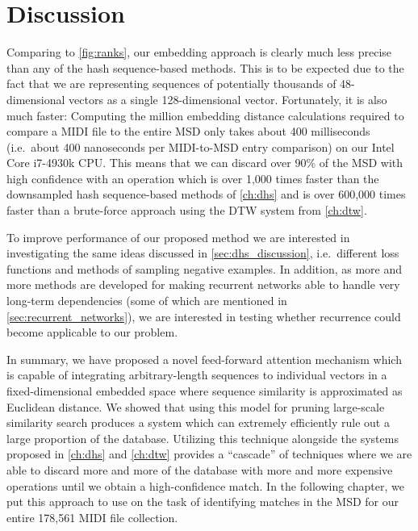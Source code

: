\section{Discussion}
\label{sec:pse_discussion}

Comparing to \cref{fig:ranks}, our embedding approach is clearly much less precise than any of the hash sequence-based methods.
This is to be expected due to the fact that we are representing sequences of potentially thousands of 48-dimensional vectors as a single 128-dimensional vector.
Fortunately, it is also much faster: Computing the million embedding distance calculations required to compare a MIDI file to the entire MSD only takes about 400 milliseconds (i.e.\ about 400 nanoseconds per MIDI-to-MSD entry comparison) on our Intel Core i7-4930k CPU.
This means that we can discard over 90\% of the MSD with high confidence with an operation which is over 1,000 times faster than the downsampled hash sequence-based methods of \cref{ch:dhs} and is over 600,000 times faster than a brute-force approach using the DTW system from \cref{ch:dtw}.

To improve performance of our proposed method we are interested in investigating the same ideas discussed in \cref{sec:dhs_discussion}, i.e.\ different loss functions and methods of sampling negative examples.
In addition, as more and more methods are developed for making recurrent networks able to handle very long-term dependencies (some of which are mentioned in \cref{sec:recurrent_networks}), we are interested in testing whether recurrence could become applicable to our problem.

In summary, we have proposed a novel feed-forward attention mechanism which is capable of integrating arbitrary-length sequences to individual vectors in a fixed-dimensional embedded space where sequence similarity is approximated as Euclidean distance.
We showed that using this model for pruning large-scale similarity search produces a system which can extremely efficiently rule out a large proportion of the database.
Utilizing this technique alongside the systems proposed in \cref{ch:dhs} and \cref{ch:dtw} provides a ``cascade'' of techniques where we are able to discard more and more of the database with more and more expensive operations until we obtain a high-confidence match.
In the following chapter, we put this approach to use on the task of identifying matches in the MSD for our entire 178,561 MIDI file collection.
